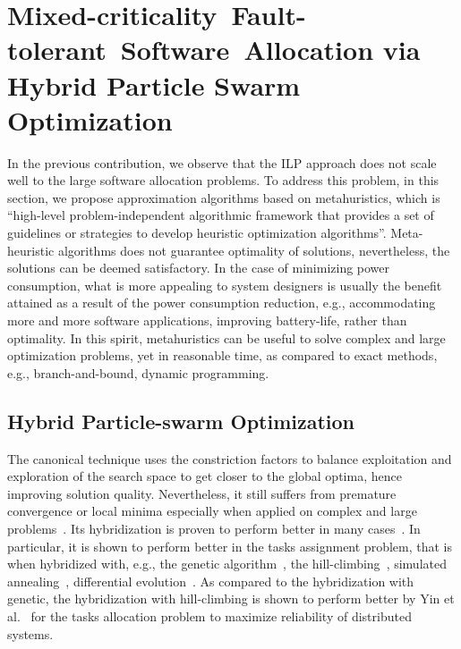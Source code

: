 \section{Mixed-criticality~Fault-tolerant~Software~Allocation via Hybrid Particle Swarm Optimization}\label{rc_pso}
In the previous contribution, we observe that the ILP approach does not scale well to the large software allocation problems. To address this problem, in this section, we propose approximation algorithms based on metahuristics, which is ``high-level problem-independent algorithmic framework that provides a set of guidelines or strategies to develop heuristic optimization algorithms''. Meta-heuristic algorithms does not guarantee optimality of solutions, nevertheless, the solutions can be deemed satisfactory. In the case of minimizing power consumption, what is more appealing to system designers is usually the benefit attained as a result of the power consumption reduction, e.g., accommodating more and more software applications, improving battery-life, rather than optimality. In this spirit, metahuristics can be useful to solve complex and large optimization problems, yet in reasonable time, as compared to exact methods, e.g., branch-and-bound, dynamic programming.

\subsection*{Hybrid Particle-swarm Optimization}
The canonical \pso{} technique uses the constriction factors to balance exploitation and exploration of the search space to get closer to the global optima, hence improving solution quality. Nevertheless, it still suffers from premature convergence or local minima especially when applied on complex and large problems~\cite{Rini2011ParticleChallenges}. Its hybridization is proven to perform better in many cases~\cite{Sengupta2018ParticlePerspectives}. In particular, it is shown to perform better in the tasks assignment problem, that is when hybridized with, e.g., the genetic algorithm~\cite{Sailer2013OptimizingAUTOSAR}, the hill-climbing~\cite{yin2007task}, simulated annealing~\cite{Zhao2007ASystem}, differential evolution~\cite{Storn1997DifferentialSpaces}. As compared to the hybridization with genetic, the hybridization with hill-climbing \hcpso{} is shown to perform better by Yin et al.~\cite{yin2007task} for the tasks allocation problem to maximize reliability of distributed systems. 

